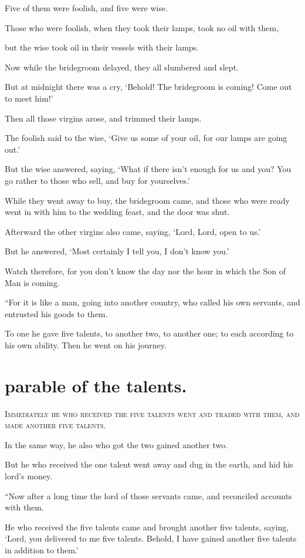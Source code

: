 Five of them were foolish, and five were wise.

Those who were foolish, when they took their lamps, took no oil with them,

but the wise took oil in their vessels with their lamps.

Now while the bridegroom delayed, they all slumbered and slept.

But at midnight there was a cry, ‘Behold! The bridegroom is coming! Come out to meet him!’

Then all those virgins arose, and trimmed their lamps.

The foolish said to the wise, ‘Give us some of your oil, for our lamps are going out.’

But the wise answered, saying, ‘What if there isn’t enough for us and you? You go rather to those who sell, and buy for yourselves.’

While they went away to buy, the bridegroom came, and those who were ready went in with him to the wedding feast, and the door was shut.

Afterward the other virgins also came, saying, ‘Lord, Lord, open to us.’

But he answered, ‘Most certainly I tell you, I don’t know you.’

Watch therefore, for you don’t know the day nor the hour in which the Son of Man is coming.

“For it is like a man, going into another country, who called his own servants, and entrusted his goods to them.

To one he gave five talents, to another two, to another one; to each according to his own ability. Then he went on his journey.


\clearpage \section*{parable of the talents.}

\lettrine{I}{mmediately he who received the five talents went and traded with them, and made another five talents.}

In the same way, he also who got the two gained another two.

But he who received the one talent went away and dug in the earth, and hid his lord’s money.

“Now after a long time the lord of those servants came, and reconciled accounts with them.

He who received the five talents came and brought another five talents, saying, ‘Lord, you delivered to me five talents. Behold, I have gained another five talents in addition to them.’


